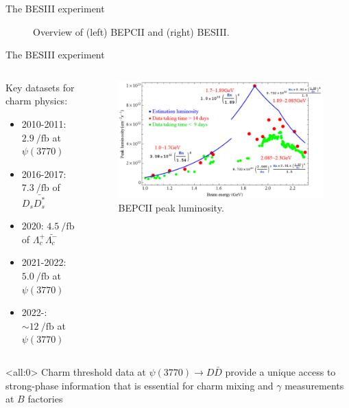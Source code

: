 \documentclass{beamer}
\begin{document}
\begin{frame}{The BESIII experiment}
\begin{figure}
\begin{subfigure}{0.5\textwidth}
    \end{subfigure}
    \caption*{Overview of (left) BEPCII and (right) BESIII.}
  \end{figure}
\end{frame}

\begin{frame}{The BESIII experiment}
  \begin{columns}
    \begin{column}{0.5\textwidth}
      \vspace{0.0cm}
      {\large Key datasets for charm physics:}
      \begin{itemize}
      \item{2010-2011: $\SI{2.9}{\per\femto\barn}$ at $\psi(3770)$}
      \item{2016-2017: $\SI{7.3}{\per\femto\barn}$ of $D_s\bar{D_s^*}$}
      \item{2020: $\SI{4.5}{\per\femto\barn}$ of $\Lambda_c^+\bar{\Lambda_c^-}$}
      \item{2021-2022: $\SI{5.0}{\per\femto\barn}$ at $\psi(3770)$}
      \item{2022-: $\sim\SI{12}{\per\femto\barn}$ at $\psi(3770)$}
      \end{itemize}
    \end{column}
    \begin{column}{0.5\textwidth}
      \vspace{0.5cm}
      \begin{figure}
        \includegraphics[width=1.0\textwidth]{Figures/BEPCII_Luminosity.png}
        \caption*{BEPCII peak luminosity.}
      \end{figure}
    \end{column}
  \end{columns}
  \begin{block}{}<all:0>
    Charm threshold data at $\psi(3770)\to D\bar{D}$ provide a unique access to strong-phase information that is essential for charm mixing and $\gamma$ measurements at $B$ factories
  \end{block}
\end{frame}
\end{document}
